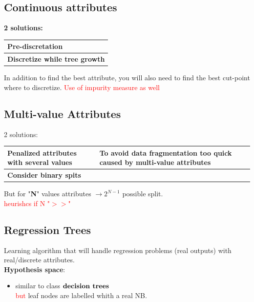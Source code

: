 \subsection{Continuous attributes}
\textbf{2 solutions:}

  \begin{table}[H]
    \begin{center}
    \begin{tabular}{|m{20em}|}
    \hline
    \rowcolor{blue.g} \textbf{Pre-discretation}\\ \hline
    \rowcolor{vert.g} \textbf{Discretize while tree growth}            
    \end{tabular}
    \end{center}
\end{table}


In addition to find the best attribute, you will also need to find the best cut-point where to discretize. \textcolor{red}{Use of impurity measure as well}
\subsection{Multi-value Attributes}

 2 solutions:
  \begin{table}[H]
    \begin{center}
    \begin{tabular}{|m{20em}|m{20em}|}
    \hline
    \rowcolor{blue.g} \textbf{Penalized attributes with several values} & To avoid data fragmentation too quick caused by multi-value attributes\\ \hline
    \rowcolor{vert.g} \textbf{Consider binary spits} &           
    \end{tabular}
    \end{center}
\end{table}
 But for "\textbf{N}" values attributes $\rightarrow 2^{N-1}$ possible split.\\
 \textcolor{red}{heurishcs if N  "$>>$"}

\subsection{Regression Trees}
Learning algorithm that will handle regression problems (real outputs) with real/discrete attributes.\\
\textbf{Hypothesis space}:\begin{itemize}
    \item similar to class $\textbf{decision trees}$\\
    \textcolor{red}{but} leaf nodes are labelled whith a real NB.
\end{itemize} 

